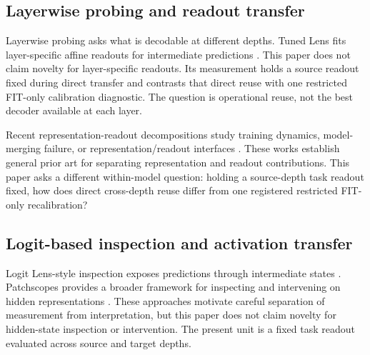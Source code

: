 \documentclass{article}
\begin{document}
\subsection{Layerwise probing and readout transfer}
Layerwise probing asks what is decodable at different depths. Tuned Lens fits layer-specific affine readouts for intermediate predictions \citep{belrose2023tunedlens}. This paper does not claim novelty for layer-specific readouts. Its measurement holds a source readout fixed during direct transfer and contrasts that direct reuse with one restricted FIT-only calibration diagnostic. The question is operational reuse, not the best decoder available at each layer.

Recent representation-readout decompositions study training dynamics, model-merging failure, or representation/readout interfaces \citep{chou2026twospeeds,janati2026postgrokking,freshhead2025localising,anthes2023diagnosing}. These works establish general prior art for separating representation and readout contributions. This paper asks a different within-model question: holding a source-depth task readout fixed, how does direct cross-depth reuse differ from one registered restricted FIT-only recalibration?

\subsection{Logit-based inspection and activation transfer}
Logit Lens-style inspection exposes predictions through intermediate states \citep{nostalgebraist2020logitlens}. Patchscopes provides a broader framework for inspecting and intervening on hidden representations \citep{ghandeharioun2024patchscopes}. These approaches motivate careful separation of measurement from interpretation, but this paper does not claim novelty for hidden-state inspection or intervention. The present unit is a fixed task readout evaluated across source and target depths.
\end{document}

